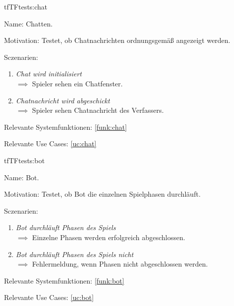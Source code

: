 \begin{description}[leftmargin=5em, style=sameline]
\begin{lhp}{tf}{TF}{tests:chat}
	\item [Name:] Chatten.
	\item [Motivation:] Testet, ob Chatnachrichten ordnungsgemäß angezeigt werden.
	\item [Sczenarien:] \hfill
	\begin{enumerate}
		\item \textit{Chat wird initialisiert} \\ $\implies$ Spieler sehen ein Chatfenster.
		\item \textit{Chatnachricht wird abgeschickt} \\ $\implies$ Spieler sehen Chatnachricht des Verfassers.
	\end{enumerate}
	\item [Relevante Systemfunktionen:] \ref{funk:chat}
	\item [Relevante Use Cases:] \ref{uc:chat}
\end{lhp}

\begin{lhp}{tf}{TF}{tests:bot}
	\item [Name:] Bot.
	\item [Motivation:] Testet, ob Bot die einzelnen Spielphasen durchläuft.
	\item [Sczenarien:] \hfill
	\begin{enumerate}
		\item \textit{Bot durchläuft Phasen des Spiels} \\ $\implies$ Einzelne Phasen werden erfolgreich abgeschlossen.
		\item \textit{Bot durchläuft Phasen des Spiels nicht} \\ $\implies$ Fehlermeldung, wenn Phasen nicht abgeschlossen werden.
	\end{enumerate}
	\item [Relevante Systemfunktionen:] \ref{funk:bot}
	\item [Relevante Use Cases:] \ref{uc:bot}
\end{lhp}


\end{description}
